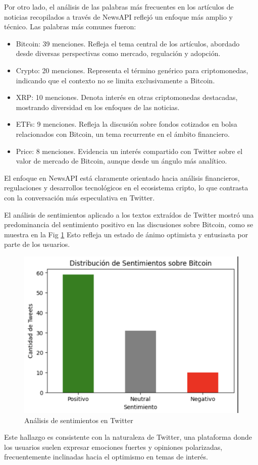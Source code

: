 \documentclass[journal]{IEEEtran}
\begin{document}
Por otro lado, el análisis de las palabras más frecuentes en los artículos de noticias recopilados a través de NewsAPI reflejó un enfoque más amplio y técnico. Las palabras más comunes fueron:
\begin{itemize}
    \item Bitcoin: 39 menciones. Refleja el tema central de los artículos, abordado desde diversas perspectivas como mercado, regulación y adopción.
    \item Crypto: 20 menciones. Representa el término genérico para criptomonedas, indicando que el contexto no se limita exclusivamente a Bitcoin.
    \item XRP: 10 menciones. Denota interés en otras criptomonedas destacadas, mostrando diversidad en los enfoques de las noticias.
    \item ETFs: 9 menciones. Refleja la discusión sobre fondos cotizados en bolsa relacionados con Bitcoin, un tema recurrente en el ámbito financiero.
    \item Price: 8 menciones. Evidencia un interés compartido con Twitter sobre el valor de mercado de Bitcoin, aunque desde un ángulo más analítico.
\end{itemize}
El enfoque en NewsAPI está claramente orientado hacia análisis financieros, regulaciones y desarrollos tecnológicos en el ecosistema cripto, lo que contrasta con la conversación más especulativa en Twitter.

El análisis de sentimientos aplicado a los textos extraídos de Twitter mostró una predominancia del sentimiento positivo en las discusiones sobre Bitcoin, como se muestra en la Fig \ref{twitter} Esto refleja un estado de ánimo optimista y entusiasta por parte de los usuarios.
\begin{figure}
    \centering
    \includegraphics[width=0.5\linewidth]{Figs/Twitter.png}
    \caption{Análisis de sentimientos en Twitter}
    \label{twitter}
\end{figure}

Este hallazgo es consistente con la naturaleza de Twitter, una plataforma donde los usuarios suelen expresar emociones fuertes y opiniones polarizadas, frecuentemente inclinadas hacia el optimismo en temas de interés.
\end{document}

